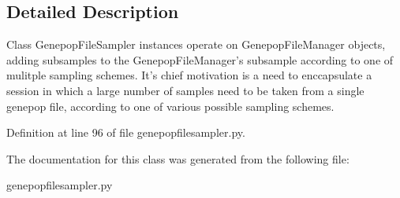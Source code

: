 \subsection{Detailed Description}
\begin{DoxyVerb}Class GenepopFileSampler instances operate on GenepopFileManager objects,
adding subsamples to the GenepopFileManager's subsample according to one of
mulitple sampling schemes.  It's chief motivation is a need to enccapsulate 
a session in which a large number of samples need to be taken from a single
genepop file, according to one of various possible sampling schemes.
\end{DoxyVerb}
 

Definition at line 96 of file genepopfilesampler.\+py.



The documentation for this class was generated from the following file\+:\begin{DoxyCompactItemize}
\item 
genepopfilesampler.\+py\end{DoxyCompactItemize}
